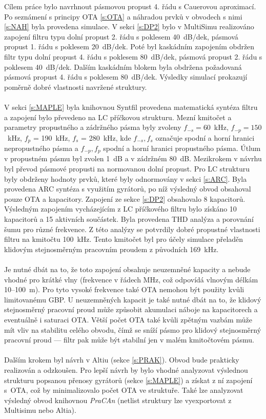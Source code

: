 \noindent Cílem práce bylo navrhnout pásmovou propust 4. řádu s Cauerovou aproximací. Po seznámení s principy OTA \ref{s:OTA} a náhradou prvků v obvodech s nimi \ref{s:NAH} byla provedena simulace. V sekci \ref{s:DP2} bylo v MultiSimu realizováno zapojení filtru typu dolní propust 2. řádu s poklesem 40~dB/dek, pásmová propust 1. řádu s poklesem 20~dB/\mbox{dek}. Poté byl kaskádním zapojením obdržen filtr typu dolní propust 4. řádu s poklesem 80~dB/dek, pásmová propust 2. řádu s poklesem 40~dB/dek. Dalším kaskádním blokem byla obdržena požadovaná pásmová propust 4. řádu s poklesem 80~dB/dek. Výsledky simulací prokazují poměrně dobré vlastnosti navržené struktury.\\
\\
V sekci \ref{s:MAPLE} byla knihovnou Syntfil provedena matematická syntéza filtru a zapojení bylo převedeno na LC příčkovou strukturu. Mezní kmitočet a parametry propustného a zádržného pásma byly zvoleny $f_{-s} = 60$~kHz, $f_{-p} = 150$~kHz, 
$f_p$ = 190~kHz, $f_s$ = 280~kHz, kde $f_{-s}, f_s$ označuje spodní a horní hranici nepropustného pásma a $f_{-p}, f_p$ spodní a horní hranici propustného pásma. Útlum v propustném pásmu byl zvolen 1~dB a v zádržném 80~dB. Mezikrokem v návrhu byl převod pásmové propusti na normovanou dolní propust. Pro LC strukturu byly obdrženy hodnoty prvků, které byly odnormovány v sekci \ref{s:ARC}. Byla provedena ARC syntéza s využitím gyrátorů, po níž výsledný obvod obsahoval pouze OTA a kapacitory. Zapojení ze sekce \ref{s:DP2} obsahovalo 8 kapacitorů. Výsledným zapojením vycházejícím z LC příčkového filtru bylo získáno 10 kapacitorů a 15 aktivních součástek. Byla provedena THD analýza a porovnání šumu pro různé frekvence. Z této analýzy se potvrdily dobré propustné vlastnosti filtru na kmitočtu 100~kHz. Tento kmitočet byl pro účely simulace přeladěn klidovým stejnosměrným pracovním proudem z původních 169~kHz. \\
\\
Je nutné dbát na to, že toto zapojení obsahuje neuzemněné kapacity a nebude vhodné pro krátké vlny (frekvence v řádech MHz, což odpovídá vlnovým délkám 10--100~m). Pro tyto vysoké frekvence také OTA nemohou být použity kvůli limitovanému GBP. U neuzemněných kapacit je také nutné dbát na to, že klidový stejnosměrný pracovní proud může způsobit akumulaci náboje na kapacitorech a eventuálně i saturaci OTA. Větší počet OTA také kvůli zpětným vazbám může mít vliv na stabilitu celého obvodu, čímž se sníží pásmo pro klidový stejnosměrný pracovní proud --- filtr pak může být stabilní jen v malém kmitočtovém pásmu.\\
\\
Dalším krokem byl návrh v Altiu (sekce \ref{s:PRAK}). Obvod bude prakticky realizován a odzkoušen. Pro lepší návrh by bylo vhodné analyzovat výslednou strukturu popsanou přenosy gyrátorů (sekce \ref{s:MAPLE}) a získat z ní zapojení s~OTA, což by minimalizovalo počet OTA ve struktuře. Také lze analyzovat výsledný obvod knihovnou \textit{PraCAn} (netlist struktury lze vyexportovat z Multisimu nebo Altia).
